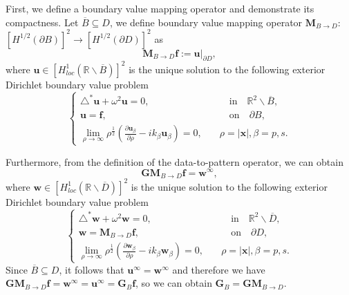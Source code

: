 \documentclass[11pt,reqno,twoside]{amsart}
\theoremstyle{definition}
\theoremstyle{remark}
\numberwithin{equation}{section}
\begin{document}
First, we define a boundary value mapping operator and demonstrate its compactness. Let $\overline{B}\subseteq D$, we define boundary value mapping operator $\mathbf M_{B \to D}$:$\left[H^{1/2}\left(\partial B \right) \right]^2 \to \left[H^{1/2}\left(\partial D \right) \right]^2$ as
\begin{equation}\label{eq:BVO}
		\mathbf M_{B \to D} \mathbf f := \mathbf u |_{\partial D},
\end{equation}
where $\mathbf u \in \left[H^{1}_{loc}\left(\mathbb R \backslash \overline{B} \right) \right]^2 $ is the unique solution to the following exterior Dirichlet boundary value problem
\begin{equation}\label{eq:ueq}
	\begin{cases}
		\triangle ^* \mathbf u + \omega ^2 \mathbf u =0, &\qquad \mbox{in}\quad \mathbb R^2 \backslash \overline{B},\\
		\mathbf u= \mathbf f , & \qquad\mbox{on} \quad \partial B ,\\
		\lim\limits_{\rho \to \infty} \rho^{\frac{1}{2}} \left( \frac{\partial \mathbf u_{\beta}}{\partial \rho} - ik_{\beta}\mathbf u_{\beta}\right) =0, &\quad \rho =|\mathbf x|, \beta = p,s.
	\end{cases}
\end{equation}

Furthermore, from the definition of the data-to-pattern operator, we can obtain
$$
	\mathbf G \mathbf M_{B \to D} \mathbf f = \mathbf w^{\infty}, 
$$
where $\mathbf w \in \left[H^{1}_{loc}\left(\mathbb R \backslash \overline{D} \right) \right]^2$ is the unique solution to the following exterior Dirichlet boundary value problem
\begin{equation}
	\begin{cases}
		\triangle ^* \mathbf w + \omega ^2 \mathbf w =0, &\qquad \mbox{in}\quad \mathbb R^2 \backslash \overline{D},\\
		\mathbf w= \mathbf M_{B \to D}\mathbf f , & \qquad\mbox{on} \quad \partial D ,\\
		\lim\limits_{\rho \to \infty} \rho^{\frac{1}{2}} \left( \frac{\partial \mathbf w_{\beta}}{\partial \rho} - ik_{\beta}\mathbf w_{\beta}\right) =0, &\quad \rho =|\mathbf x|, \beta = p,s.
	\end{cases}
\end{equation}
Since $\overline{B} \subseteq D$, it follows that $\mathbf u^{\infty} = \mathbf w^{\infty}$ and therefore we have $\mathbf G \mathbf M_{B \to D} \mathbf f = \mathbf w^{\infty} = \mathbf u^{\infty} =\mathbf G_B \mathbf f$, so we can obtain $\mathbf G_B=\mathbf G \mathbf M_{B \to D}$.
\end{document}
